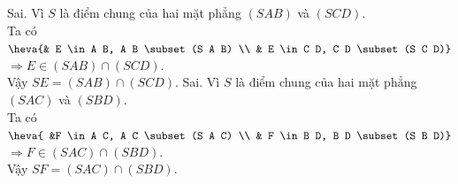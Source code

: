 \begin{ex}
{\begin{itemchoice}
   \itemch  Sai. Vì $S$ là điểm chung của hai mặt phẳng $(S A B)$ và $(S C D)$.\\
   Ta có $\heva{& E \in A B, A B \subset(S A B) \\ & E \in C D, C D \subset(S C D)}$ $\Rightarrow  E \in(S A B) \cap(S C D)$.\\
   Vậy  $S E=(S A B) \cap(S C D)$.
   \itemch Sai. Vì $S$ là điểm  chung của hai mặt phẳng $(S A C)$ và $(S B D)$.\\
   Ta có $\heva{ &F \in  A C, A C \subset(S A C) \\ & F \in B D, B D \subset(S B D)}$ $\Rightarrow F \in(S A C) \cap(S B D)$.\\
   Vậy $S F=(S A C) \cap(S B D)$. 
  \end{itemchoice}
 } 
\end{ex}

